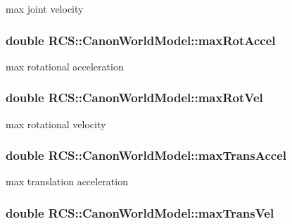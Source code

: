max joint velocity \hypertarget{structRCS_1_1CanonWorldModel_aca5f8ebce128e94ed4edf3caabb6c363}{
\subsubsection[{max\-Rot\-Accel}]{\setlength{\rightskip}{0pt plus 5cm}double R\-C\-S\-::\-Canon\-World\-Model\-::max\-Rot\-Accel}}\label{structRCS_1_1CanonWorldModel_aca5f8ebce128e94ed4edf3caabb6c363}
max rotational acceleration \hypertarget{structRCS_1_1CanonWorldModel_acbb472eee22bb4764dc865476fe56950}{
\subsubsection[{max\-Rot\-Vel}]{\setlength{\rightskip}{0pt plus 5cm}double R\-C\-S\-::\-Canon\-World\-Model\-::max\-Rot\-Vel}}\label{structRCS_1_1CanonWorldModel_acbb472eee22bb4764dc865476fe56950}
max rotational velocity \hypertarget{structRCS_1_1CanonWorldModel_a9b6d5469341e73289788ba0fe0f3c57a}{
\subsubsection[{max\-Trans\-Accel}]{\setlength{\rightskip}{0pt plus 5cm}double R\-C\-S\-::\-Canon\-World\-Model\-::max\-Trans\-Accel}}\label{structRCS_1_1CanonWorldModel_a9b6d5469341e73289788ba0fe0f3c57a}
max translation acceleration \hypertarget{structRCS_1_1CanonWorldModel_a55824e72d1d92c8b5f5c8ecf3b7c7a00}{
\subsubsection[{max\-Trans\-Vel}]{\setlength{\rightskip}{0pt plus 5cm}double R\-C\-S\-::\-Canon\-World\-Model\-::max\-Trans\-Vel}}\label{structRCS_1_1CanonWorldModel_a55824e72d1d92c8b5f5c8ecf3b7c7a00}
